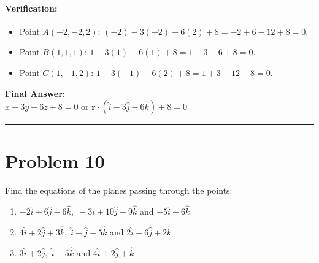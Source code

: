 \documentclass[11pt,a4paper]{article}
\begin{document}
\paragraph{Verification:}
\begin{itemize}
    \item Point $A(-2, -2, 2)$: $(-2) - 3(-2) - 6(2) + 8 = -2 + 6 - 12 + 8 = 0$. \checkmark
    \item Point $B(1, 1, 1)$: $1 - 3(1) - 6(1) + 8 = 1 - 3 - 6 + 8 = 0$. \checkmark
    \item Point $C(1, -1, 2)$: $1 - 3(-1) - 6(2) + 8 = 1 + 3 - 12 + 8 = 0$. \checkmark
\end{itemize}

\begin{resultbox}
\textbf{Final Answer:}\\
$\boxed{x - 3y - 6z + 8 = 0}$ \quad or \quad $\boxed{\mathbf{r} \cdot (\hat{i} - 3\hat{j} - 6\hat{k}) + 8 = 0}$
\end{resultbox}

\vspace{0.4cm}
\hrule
\vspace{0.4cm}

\section{Problem 10}
\begin{problembox}[Problem 10]
Find the equations of the planes passing through the points:
\begin{enumerate}
    \item[(i)] $-2\hat{i} + 6\hat{j} - 6\hat{k}, \; -3\hat{i} + 10\hat{j} - 9\hat{k}$ and $-5\hat{i} - 6\hat{k}$
    \item[(ii)] $4\hat{i} + 2\hat{j} + 3\hat{k}, \; \hat{i} + \hat{j} + 5\hat{k}$ and $2\hat{i} + 6\hat{j} + 2\hat{k}$
    \item[(iii)] $3\hat{i} + 2\hat{j}, \; \hat{i} - 5\hat{k}$ and $4\hat{i} + 2\hat{j} + \hat{k}$
\end{enumerate}
\end{problembox}
\end{document}
